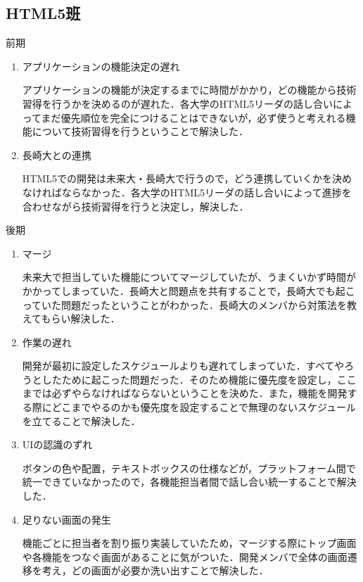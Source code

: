 \subsection{HTML5班}
前期
\begin{enumerate}
\item アプリケーションの機能決定の遅れ
\par
アプリケーションの機能が決定するまでに時間がかかり，どの機能から技術習得を行うかを決めるのが遅れた．各大学のHTML5リーダの話し合いによってまだ優先順位を完全につけることはできないが，必ず使うと考えれる機能について技術習得を行うということで解決した．
\item 長崎大との連携
\par
HTML5での開発は未来大・長崎大で行うので，どう連携していくかを決めなければならなかった．各大学のHTML5リーダの話し合いによって進捗を合わせながら技術習得を行うと決定し，解決した．
\end{enumerate}
\par
\par
後期
\par
\begin{enumerate}
\item マージ
\par
未来大で担当していた機能についてマージしていたが、うまくいかず時間がかかってしまっていた．長崎大と問題点を共有することで，長崎大でも起こっていた問題だったということがわかった．長崎大のメンバから対策法を教えてもらい解決した．
\item 作業の遅れ
\par
開発が最初に設定したスケジュールよりも遅れてしまっていた．すべてやろうとしたために起こった問題だった．そのため機能に優先度を設定し，ここまでは必ずやらなければならないということを決めた．また，機能を開発する際にどこまでやるのかも優先度を設定することで無理のないスケジュールを立てることで解決した．
\item UIの認識のずれ
\par
ボタンの色や配置，テキストボックスの仕様などが，プラットフォーム間で統一できていなかったので，各機能担当者間で話し合い統一することで解決した．
\item 足りない画面の発生
\par 
機能ごとに担当者を割り振り実装していたため，マージする際にトップ画面や各機能をつなぐ画面があることに気がついた．開発メンバで全体の画面遷移を考え，どの画面が必要か洗い出すことで解決した．
\end{enumerate}
